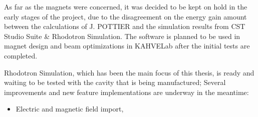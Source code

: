 \documentclass[a4paper,oneside,12pt]{report}
\numberwithin{equation}{chapter}
\begin{document}
{As far as the magnets were concerned, it was decided to be kept on hold in the early stages of the project, 
due to the disagreement on the energy gain amount between the calculations of J. POTTIER \cite{rhodo_pottier} 
and the simulation results from CST Studio Suite \& Rhodotron Simulation. 
The software is planned to be used in magnet design and beam optimizations in KAHVELab after the initial tests are completed.

Rhodotron Simulation, which has been the main focus of this thesis, is ready and waiting to be tested with the cavity that is being manufactured; 
Several improvements and new feature implementations are underway in the meantime:

\begin{itemize}
    \item Electric and magnetic field import,

\end{itemize}}
\end{document}

